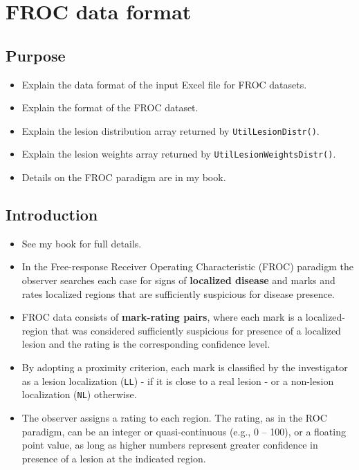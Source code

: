 \documentclass[
]{book}
\providecommand{\tightlist}{%
  \setlength{\itemsep}{0pt}\setlength{\parskip}{0pt}}
\begin{document}
\hypertarget{frocdataformat}{%
\chapter{FROC data format}\label{frocdataformat}}

\hypertarget{purpose}{%
\section{Purpose}\label{purpose}}

\begin{itemize}
\tightlist
\item
  Explain the data format of the input Excel file for FROC datasets.
\item
  Explain the format of the FROC dataset.
\item
  Explain the lesion distribution array returned by \texttt{UtilLesionDistr()}.
\item
  Explain the lesion weights array returned by \texttt{UtilLesionWeightsDistr()}.
\item
  Details on the FROC paradigm are in my book.
\end{itemize}

\hypertarget{frocdataformatIntro}{%
\section{Introduction}\label{frocdataformatIntro}}

\begin{itemize}
\tightlist
\item
  See my book \citet{RN2680} for full details.
\item
  In the Free-response Receiver Operating Characteristic (FROC) paradigm \citep{RN761} the observer searches each case for signs of \textbf{localized disease} and marks and rates localized regions that are sufficiently suspicious for disease presence.
\item
  FROC data consists of \textbf{mark-rating pairs}, where each mark is a localized-region that was considered sufficiently suspicious for presence of a localized lesion and the rating is the corresponding confidence level.
\item
  By adopting a proximity criterion, each mark is classified by the investigator as a lesion localization (\texttt{LL}) - if it is close to a real lesion - or a non-lesion localization (\texttt{NL}) otherwise.
\item
  The observer assigns a rating to each region. The rating, as in the ROC paradigm, can be an integer or quasi-continuous (e.g., 0 -- 100), or a floating point value, as long as higher numbers represent greater confidence in presence of a lesion at the indicated region.
\end{itemize}
\end{document}
